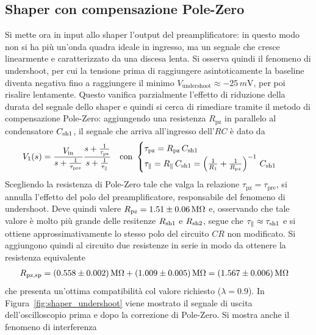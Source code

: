 \subsection{Shaper con compensazione Pole-Zero}\label{sec:shaper_pz}

Si mette ora in input allo shaper l'output del preamplificatore: in questo modo non si ha più
un'onda quadra ideale in ingresso, ma un segnale che cresce linearmente e caratterizzato da
una discesa lenta. Si osserva quindi il fenomeno di undershoot, per cui la tensione prima
di raggiungere asintoticamente la baseline diventa negativa fino a raggiungere
il minimo
$V_{\text{undershoot}}\approx-25\,\si{m\volt}$, per poi risalire
lentamente. Questo vanifica parzialmente l'effetto di riduzione della durata
del segnale dello shaper e quindi si cerca di rimediare tramite
il metodo di compensazione Pole-Zero: aggiungendo una resistenza $R_{\text{pz}}$ in parallelo al condensatore $C_{\sh 1}$, il segnale che
arriva all'ingresso dell'$RC$ è dato da
\begin{align}
  V_{1}(s)&=\frac{V_{\inp}}{s+\frac{1}{\tau_{\text{pre}}}}\frac{s+\frac{1}{\tau_{\text{pz}}}}{s+\frac{1}{\tau_{\parallel}}}
  &
    \text{con }& \begin{cases}
      \tau_{\text{pz}}=R_{\text{pz}}\,C_{\text{sh1}}\\
      \tau_{\parallel}=R_{\parallel}\,C_{\text{sh1}}=\left(\frac{1}{R_{1}}+\frac{1}{R_{\text pz}}\right)^{-1}\,C_{\text{sh1}}
    \end{cases}
\end{align}
Scegliendo la resistenza di Pole-Zero tale che valga la relazione $\tau_{\text{pz}}=\tau_{\text{pre}}$, si annulla l'effetto del polo del preamplificatore,
responsabile del fenomeno di undershoot. Deve quindi valere $R_{\text{pz}}=1.51\pm 0.06\MOhm$ e, osservando che
tale valore è molto più grande delle resitenze $R_{\sh 1}$ e $R_{\sh2}$, segue che $\tau_{\parallel}\approx \tau_{\sh 1}$
e si ottiene approssimativamente lo stesso polo del circuito $CR$ non modificato. Si aggiungono quindi al circuito due resistenze in serie in modo
da ottenere la resistenza equivalente
\begin{align}
  R_{\text{pz,sp}}&= (0.558\pm0.002)\MOhm + (1.009\pm0.005)\MOhm = (1.567\pm 0.006) \MOhm
\end{align}
che presenta un'ottima compatibilità col valore richiesto ($\lambda=0.9$).
In Figura~\ref{fig:shaper_undershoot} viene mostrato il segnale di uscita dell'oscilloscopio prima e
dopo la correzione di Pole-Zero. Si mostra anche il fenomeno di interferenza
